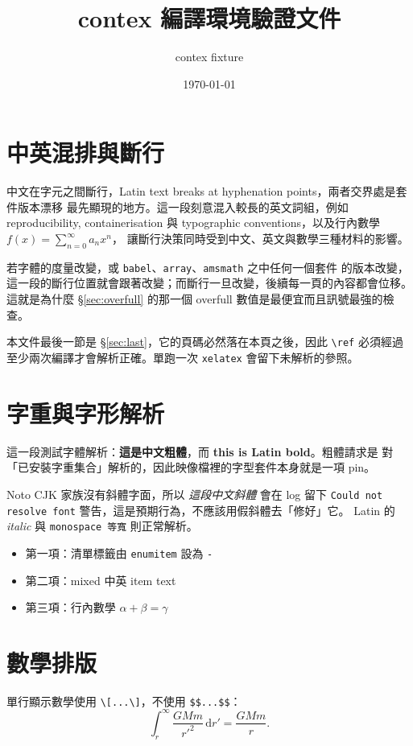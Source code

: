 \documentclass[11pt, a4paper]{article}
\title{\textbf{contex 編譯環境驗證文件}}
\author{contex fixture}
\date{\today}
\begin{document}
\maketitle

\tableofcontents

\section{中英混排與斷行}\label{sec:mixed}
中文在字元之間斷行，Latin text breaks at hyphenation points，兩者交界處是套件版本漂移
最先顯現的地方。這一段刻意混入較長的英文詞組，例如 reproducibility, containerisation
與 typographic conventions，以及行內數學 $f(x) = \sum_{n=0}^{\infty} a_n x^n$，
讓斷行決策同時受到中文、英文與數學三種材料的影響。

若字體的度量改變，或 \texttt{babel}、\texttt{array}、\texttt{amsmath} 之中任何一個套件
的版本改變，這一段的斷行位置就會跟著改變；而斷行一旦改變，後續每一頁的內容都會位移。
這就是為什麼 \S\ref{sec:overfull} 的那一個 overfull 數值是最便宜而且訊號最強的檢查。

本文件最後一節是 \S\ref{sec:last}，它的頁碼必然落在本頁之後，因此 \verb|\ref| 必須經過
至少兩次編譯才會解析正確。單跑一次 \texttt{xelatex} 會留下未解析的參照。

\section{字重與字形解析}\label{sec:weights}
這一段測試字體解析：\textbf{這是中文粗體}，而 \textbf{this is Latin bold}。粗體請求是
對「已安裝字重集合」解析的，因此映像檔裡的字型套件本身就是一項 pin。

Noto CJK 家族沒有斜體字面，所以 \textit{這段中文斜體} 會在 log 留下
\texttt{Could not resolve font} 警告，這是預期行為，不應該用假斜體去「修好」它。
Latin 的 \textit{italic} 與 \texttt{monospace 等寬} 則正常解析。

\begin{itemize}
  \item 第一項：清單標籤由 \texttt{enumitem} 設為 \texttt{-}
  \item 第二項：mixed 中英 item text
  \item 第三項：行內數學 $\alpha + \beta = \gamma$
\end{itemize}

\section{數學排版}\label{sec:math}
單行顯示數學使用 \verb|\[...\]|，不使用 \verb|$$...$$|：
\[
  \int_{r}^{\infty} \frac{GMm}{r'^{2}} \, \mathrm{d}r' = \frac{GMm}{r}.
\]
\end{document}
